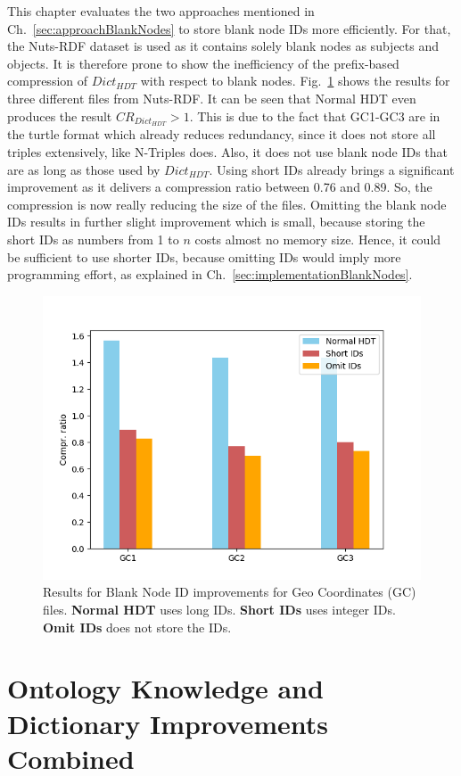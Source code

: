 This chapter evaluates the two approaches mentioned in Ch.~\ref{sec:approachBlankNodes} to store blank node IDs more efficiently. For that, the Nuts-RDF dataset is used as it contains solely blank nodes as subjects and objects. It is therefore prone to show the inefficiency of the prefix-based compression of $Dict_{HDT}$ with respect to blank nodes. Fig.~\ref{fig:blanknodes} shows the results for three different files from Nuts-RDF. It can be seen that Normal HDT even produces the result $CR_{Dict_{HDT}}>1$. This is due to the fact that GC1-GC3 are in the turtle format which already reduces redundancy, since it does not store all triples extensively, like N-Triples does. Also, it does not use blank node IDs that are as long as those used by $Dict_{HDT}$. Using short IDs already brings a significant improvement as it delivers a compression ratio between 0.76 and 0.89. So, the compression is now really reducing the size of the files. Omitting the blank node IDs results in further slight improvement which is small, because storing the short IDs as numbers from 1 to $n$ costs almost no memory size. Hence, it could be sufficient to use shorter IDs, because omitting IDs would imply more programming effort, as explained in Ch.~\ref{sec:implementationBlankNodes}.


\begin{figure}
	\centering
	\includegraphics[width=0.7\linewidth]{figures/4_evaluation/blankNodes}
	\caption{Results for Blank Node ID improvements for Geo Coordinates (GC) files. \textbf{Normal HDT} uses long IDs. \textbf{Short IDs} uses integer IDs. \textbf{Omit IDs} does not store the IDs.}
	\label{fig:blanknodes}
\end{figure}


\section{Ontology Knowledge and Dictionary Improvements Combined}






